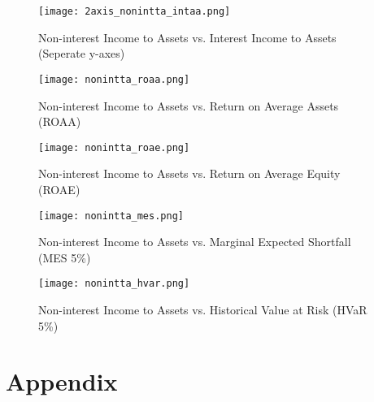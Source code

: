 \documentclass[10pt]{article} %
\begin{document}
\begin{figure}[H] 
\caption{Non-interest Income to Assets vs. Interest Income to Assets (Seperate y-axes)}
\centering 
\texttt{[image: 2axis\_nonintta\_intaa.png]}
\end{figure} 

\newpage
\thispagestyle{plain}
\begin{figure}[H] 
\caption{Non-interest Income to Assets vs. Return on Average Assets (ROAA)}
\centering 
\texttt{[image: nonintta\_roaa.png]}
\end{figure} 

\begin{figure}[H] 
\caption{Non-interest Income to Assets vs. Return on Average Equity (ROAE)}
\centering 
\texttt{[image: nonintta\_roae.png]}
\end{figure} 
\newpage

\thispagestyle{plain}
\begin{figure}[H] 
\caption{Non-interest Income to Assets vs. Marginal Expected Shortfall (MES 5\%)}
\centering 
\texttt{[image: nonintta\_mes.png]}
\end{figure} 

\begin{figure}[H] 
\caption{Non-interest Income to Assets vs. Historical Value at Risk (HVaR 5\%)}
\centering 
\texttt{[image: nonintta\_hvar.png]}
\end{figure} 


\newpage
\thispagestyle{plain}
\section{Appendix}
\end{document}
